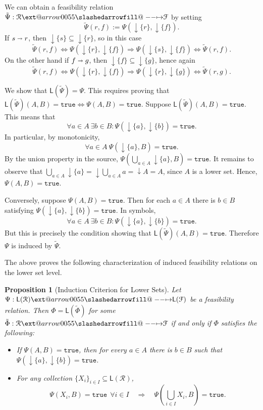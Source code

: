 \documentclass[12pt]{article}
\makeatletter
\theoremstyle{definition}
\theoremstyle{plain}
\theoremstyle{plain}
\newtheorem{proposition}{Proposition}[section]
\theoremstyle{plain}
\theoremstyle{plain}
\theoremstyle{remark}
\theoremstyle{remark}
\newcommand{\mc}[1]{\mathcal{#1}}
\newcommand{\sub}{\subseteq}
\newcommand{\low}{\mathsf{L}}
\newcommand{\true}{\mathtt{true}}
\newcommand{\lwc}[1]{{\downarrow #1}}
\def\slashedarrowfill@#1#2#3#4#5{%
	$\m@th\thickmuskip0mu\medmuskip\thickmuskip\thinmuskip\thickmuskip
	\relax#5#1\mkern-7mu%
	\cleaders\hbox{$#5\mkern-2mu#2\mkern-2mu$}\hfill
	\mathclap{#3}\mathclap{#2}%
	\cleaders\hbox{$#5\mkern-2mu#2\mkern-2mu$}\hfill
	\mkern-7mu#4$%
}
\def\rightslashedarrowfill@{%
	\slashedarrowfill@\relbar\relbar\mapstochar\rightarrow}
\newcommand\xslashedrightarrow[2][]{%
	\ext@arrow 0055{\rightslashedarrowfill@}{#1}{#2}}
\makeatother
\begin{document}
We can obtain a feasibility relation $\tilde\Psi: \mc{R} \xslashedrightarrow{} \mc{F}$ by setting $$\tilde\Psi(r,f) := \Psi(\lwc{\{r\}},\lwc{\{f\}}).$$ If $s \shortrightarrow r$, then $\lwc{\{s\}} \sub \lwc{\{r\}}$, so in this case $$\tilde\Psi(r,f) \Leftrightarrow \Psi(\lwc{\{r\}},\lwc{\{f\}}) \Rightarrow \Psi(\lwc{\{s\}},\lwc{\{f\}}) \Leftrightarrow \tilde\Psi(r,f).$$
On the other hand if $f \shortrightarrow g$, then $\lwc{\{f\}} \sub \lwc{\{g\}}$, hence again
$$\tilde\Psi(r,f) \Leftrightarrow \Psi(\lwc{\{r\}},\lwc{\{f\}}) \Rightarrow \Psi(\lwc{\{r\}},\lwc{\{g\}}) \Leftrightarrow \tilde\Psi(r,g).$$

We show that $\low(\tilde\Psi) = \Psi$. This requires proving that $\low(\tilde\Psi)(A,B) = \true \Leftrightarrow  \Psi(A,B) = \true$. Suppose $\low(\tilde\Psi)(A,B) = \true$. This means that 
$$\forall a \in A \: \exists b \in B: \Psi(\lwc{\{a\}},\lwc{\{b\}})=\true .$$
In particular, by monotonicity,
$$\forall a \in A \: \Psi(\lwc{\{a\}},B)=\true.$$ 
By the union property in the source, $\Psi(\bigcup_{a \in A}\lwc{\{a\}},B)=\true$. It remains to observe that $\bigcup_{a \in A} \lwc{\{a\}} = \lwc{\bigcup_{a \in A} a} = \lwc{A}= A$, since $A$ is a lower set. Hence, $\Psi(A,B) =\true$.

Conversely, suppose $\Psi(A,B) = \true$. Then for each $a \in A$ there is $b \in B$ satisfying $\Psi(\lwc{\{a\}},\lwc{\{b\}}) =\true$. In symbols,
$$\forall a \in A \: \exists b \in B: \Psi(\lwc{\{a\}},\lwc{\{b\}})=\true .$$
But this is precisely the condition showing that $\low(\tilde\Psi)(A,B)=\true$. Therefore $\Psi$ is induced by $\tilde\Psi$.

The above proves the following characterization of induced feasibility relations on the lower set level.
\begin{proposition}[Induction Criterion for Lower Sets]\label{prop:induction lower}
	Let $\Psi: \low(\mc{R}) \xslashedrightarrow{} \low(\mc{F})$ be a feasibility relation. Then $\Phi = \low(\tilde\Phi)$ for some $\tilde\Phi: \mc{R} \xslashedrightarrow{} \mc{F}$ if and only if $\Phi$ satisfies the following: 	
\begin{itemize}
	\item If $\Psi(A,B)=\true$, then for every $a \in A$ there is $b \in B$ such that $\Psi(\lwc{\{a\}},\lwc{\{b\}})=\true$.
	\item For any collection $\{X_i\}_{i \in I} \sub \low(\mc{R})$,
	$$\Psi(X_i,B) = \true \:\: \forall i \in I \quad \Rightarrow \quad \Psi(\bigcup_{i \in I} X_i,B) = \true.$$
\end{itemize}	
\end{proposition} 
\end{document}
